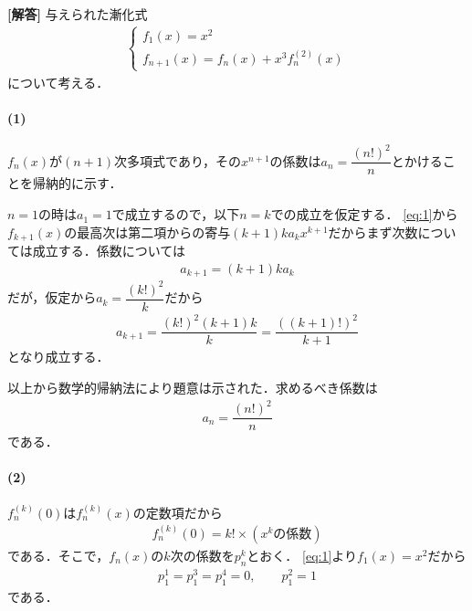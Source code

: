\documentclass[../../main.tex]{subfiles}
\begin{document}
\begin{oframed}
  
\end{oframed}

{\bf [解答]}
与えられた漸化式
\begin{align}
  \begin{cases}
    f_1(x)=x^2 \\
    f_{n+1}(x)=f_n(x)+x^3f_n^{(2)}(x)
  \end{cases} \label{eq:1}
\end{align}
について考える．

\paragraph{(1)}

$f_n(x)$が$(n+1)$次多項式であり，その$x^{n+1}$の係数は$a_n=\dfrac{(n!)^2}{n}$とかけることを帰納的に示す．

$n=1$の時は$a_1=1$で成立するので，以下$n=k$での成立を仮定する．
\cref{eq:1}から$f_{k+1}(x)$の最高次は第二項からの寄与$(k+1)ka_kx^{k+1}$だからまず次数については成立する．係数については
\begin{align}
  a_{k+1} = (k+1)ka_k
\end{align}
だが，仮定から$a_k=\dfrac{(k!)^2}{k}$だから
\begin{align}
  a_{k+1} = \dfrac{(k!)^2(k+1)k}{k} = \dfrac{((k+1)!)^2}{k+1}
\end{align}
となり成立する．

以上から数学的帰納法により題意は示された．求めるべき係数は
\begin{align}
  a_n = \dfrac{(n!)^2}{n}
\end{align}
である．

\paragraph{(2)}

$f_n^{(k)}(0)$は$f_n^{(k)}(x)$の定数項だから
\begin{align}
  f_n^{(k)}(0)=k!\times(x^k\text{の係数}) \label{eq:2}
\end{align}
である．そこで，$f_n(x)$の$k$次の係数を$p^{k}_{n}$とおく．
\cref{eq:1}より$f_1(x)=x^2$だから
\begin{align}
  p^{1}_{1}=p^{3}_{1}=p^{4}_{1}=0,\qquad p^{2}_{1}=1 \label{eq:3}
\end{align}
である．
\end{document}
